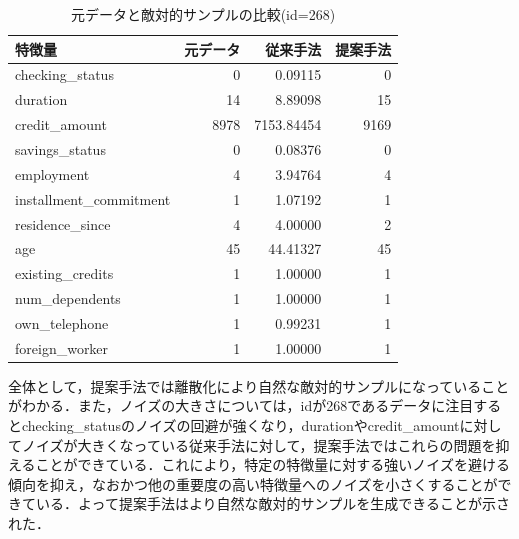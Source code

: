 \begin{table}[H]
    \centering
    \caption{元データと敵対的サンプルの比較(id=268)}
    \begin{tabular}{|l|r|r|r|} \hline
        特徴量 & 元データ & 従来手法 & 提案手法 \\ \hline
        checking\_status & 0 & 0.09115 & 0 \\ \hline
        duration & 14 & 8.89098 & 15 \\ \hline
        credit\_amount & 8978 & 7153.84454 & 9169 \\ \hline
        savings\_status & 0 & 0.08376 & 0 \\ \hline
        employment & 4 & 3.94764 & 4 \\ \hline
        installment\_commitment & 1 & 1.07192 & 1 \\ \hline
        residence\_since & 4 & 4.00000 & 2 \\ \hline
        age & 45 & 44.41327 & 45 \\ \hline
        existing\_credits & 1 & 1.00000 & 1 \\ \hline
        num\_dependents & 1 & 1.00000 & 1 \\ \hline
        own\_telephone & 1 & 0.99231 & 1 \\ \hline
        foreign\_worker & 1 & 1.00000 & 1 \\ \hline
    \end{tabular}
\end{table}

全体として，提案手法では離散化により自然な敵対的サンプルになっていることがわかる．また，ノイズの大きさについては，idが268であるデータに注目するとchecking\_statusのノイズの回避が強くなり，durationやcredit\_amountに対してノイズが大きくなっている従来手法に対して，提案手法ではこれらの問題を抑えることができている．これにより，特定の特徴量に対する強いノイズを避ける傾向を抑え，なおかつ他の重要度の高い特徴量へのノイズを小さくすることができている．よって提案手法はより自然な敵対的サンプルを生成できることが示された．
